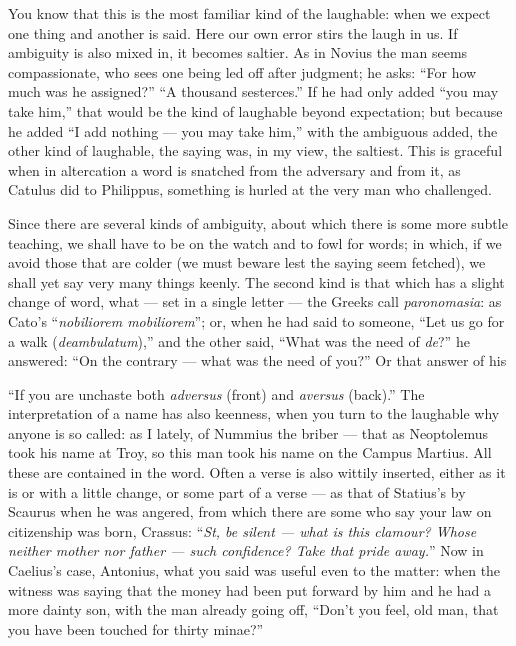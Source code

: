  You know that this is the most familiar kind of the laughable: when we expect one thing and another is said. Here our own error stirs the laugh in us. If ambiguity is also mixed in, it becomes saltier. As in Novius the man seems compassionate, who sees one being led off after judgment; he asks: ``For how much was he assigned?'' ``A thousand sesterces.'' If he had only added ``you may take him,'' that would be the kind of laughable beyond expectation; but because he added ``I add nothing — you may take him,'' with the ambiguous added, the other kind of laughable, the saying was, in my view, the saltiest. This is graceful when in altercation a word is snatched from the adversary and from it, as Catulus did to Philippus, something is hurled at the very man who challenged.

 Since there are several kinds of ambiguity, about which there is some more subtle teaching, we shall have to be on the watch and to fowl for words; in which, if we avoid those that are colder (we must beware lest the saying seem fetched), we shall yet say very many things keenly. The second kind is that which has a slight change of word, what — set in a single letter — the Greeks call \textit{paronomasia}: as Cato's ``\textit{nobiliorem mobiliorem}''; or, when he had said to someone, ``Let us go for a walk (\textit{deambulatum}),'' and the other said, ``What was the need of \textit{de}?'' he answered: ``On the contrary — what was the need of you?'' Or that answer of his

 ``If you are unchaste both \textit{adversus} (front) and \textit{aversus} (back).'' The interpretation of a name has also keenness, when you turn to the laughable why anyone is so called: as I lately, of Nummius the briber — that as Neoptolemus took his name at Troy, so this man took his name on the Campus Martius. All these are contained in the word. Often a verse is also wittily inserted, either as it is or with a little change, or some part of a verse — as that of Statius's by Scaurus when he was angered, from which there are some who say your law on citizenship was born, Crassus: ``\textit{St, be silent — what is this clamour? Whose neither mother nor father — such confidence? Take that pride away.}'' Now in Caelius's case, Antonius, what you said was useful even to the matter: when the witness was saying that the money had been put forward by him and he had a more dainty son, with the man already going off, ``Don't you feel, old man, that you have been touched for thirty minae?''

